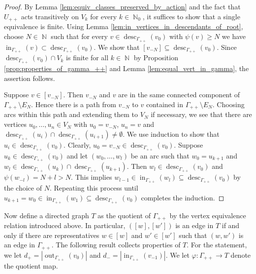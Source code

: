 \documentclass{article}
\DeclareMathOperator\out{out}
\DeclareMathOperator\desc{desc}
\DeclareMathOperator\bbN{\mathbb{N}}
\theoremstyle{definition}
\begin{document}
\begin{proof}
By Lemma \ref{lem:equiv_classes_preserved_by_action} and the fact that $U_{++}$ acts transitively on $V_{k}$ for every $k\in\bbN_{0}$, it suffices to show that a single equivalence is finite. Using Lemma \ref{lem:in_vertices_in_descendants_of_root}, choose $N\in\bbN$ such that for every $v\in \desc_{\Gamma_{++}}(v_{0})$ with $\psi(v)\ge N$ we have $\operatorname{in}_{\Gamma_{++}}(v)\subset \desc_{\Gamma_{++}}(v_0)$. We show that $[v_{-N}]\!\subseteq\! \desc_{\Gamma_{++}}(v_0)$. Since $\desc_{\Gamma_{++}}(v_0)\cap V_{k}$ is finite for all $k\in\bbN$ by Proposition \ref{prop:properties_of_gamma_++} and Lemma \ref{lem:equal_vert_in_gamma}, the assertion follows.

Suppose $v\in [v_{-N}]$. Then $v_{-N}$ and $v$ are in the same connected component of $\Gamma_{++}\!\setminus E_{N}$. Hence there is a path from $v_{-N}$ to $v$ contained in $\Gamma_{++}\setminus E_{N}$. Choosing arcs within this path and extending them to $V_{N}$ if necessary, we see that there are vertices $u_0,\ldots, u_{n}\in V_{N}$ with $u_0 = v_{-N}$, $u_{n} = v$ and $\desc_{\Gamma_{++}}(u_{i})\cap \desc_{\Gamma_{++}}(u_{i+1})\neq \emptyset$. We use induction to show that $u_{i}\in \desc_{\Gamma_{++}}(v_0)$. Clearly, $u_0 = v_{-N}\in \desc_{\Gamma_{++}}(v_0)$. Suppose $u_k\in \desc_{\Gamma_{++}}(v_0)$ and let $(w_{0},\ldots,w_{l})$ be an arc such that $w_{0} = u_{k+1}$ and $w_l\!\in\! \desc_{\Gamma_{++}}(u_k)\cap \desc_{\Gamma_{++}}(u_{k+1})$. Then $w_{l}\!\in\! \desc_{\Gamma_{++}}(v_0)$ and $\psi(w_{-l}) = N + l > N$. This implies $w_{l - 1}\in \operatorname{in}_{\Gamma_{++}}(w_l)\subseteq \desc_{\Gamma_{++}}(v_0)$ by the choice of $N$. Repeating this process until $u_{k+1}\!=\! w_{0}\!\in\! \operatorname{in}_{\Gamma_{++}}(w_{1})\!\subseteq\! \desc_{\Gamma_{++}}(v_0)$ completes the induction.
\end{proof}

Now define a directed graph $T$ as the quotient of $\Gamma_{++}$ by the vertex equivalence relation introduced above. In particular, $([w],[w'])$ is an edge in $T$ if and only if there are representatives $w\in[w]$ and $w'\in[w']$ such that $(w,w')$ is an edge in $\Gamma_{++}$. The following result collects properties of $T$. For the statement, we let $d_{+} = |\out_{\Gamma_{++}}(v_0)|$ and $d_{-} = |\operatorname{in}_{\Gamma_{++}}(v_{-1})|$. We let $\varphi:\Gamma_{++}\to T$ denote the quotient map.
\end{document}
